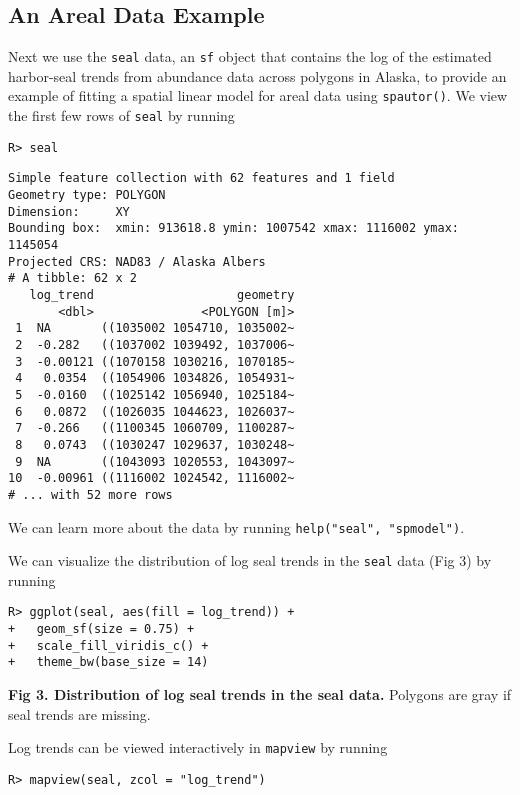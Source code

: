 \documentclass[10pt,letterpaper]{article}
\begin{document}
\hypertarget{an-areal-data-example}{%
\subsection{An Areal Data Example}\label{an-areal-data-example}}

Next we use the \texttt{seal} data, an \texttt{sf} object that contains
the log of the estimated harbor-seal trends from abundance data across
polygons in Alaska, to provide an example of fitting a spatial linear
model for areal data using \texttt{spautor()}. We view the first few
rows of \texttt{seal} by running

\begin{verbatim}
R> seal
\end{verbatim}

\begin{verbatim}
Simple feature collection with 62 features and 1 field
Geometry type: POLYGON
Dimension:     XY
Bounding box:  xmin: 913618.8 ymin: 1007542 xmax: 1116002 ymax: 1145054
Projected CRS: NAD83 / Alaska Albers
# A tibble: 62 x 2
   log_trend                    geometry
       <dbl>               <POLYGON [m]>
 1  NA       ((1035002 1054710, 1035002~
 2  -0.282   ((1037002 1039492, 1037006~
 3  -0.00121 ((1070158 1030216, 1070185~
 4   0.0354  ((1054906 1034826, 1054931~
 5  -0.0160  ((1025142 1056940, 1025184~
 6   0.0872  ((1026035 1044623, 1026037~
 7  -0.266   ((1100345 1060709, 1100287~
 8   0.0743  ((1030247 1029637, 1030248~
 9  NA       ((1043093 1020553, 1043097~
10  -0.00961 ((1116002 1024542, 1116002~
# ... with 52 more rows
\end{verbatim}

We can learn more about the data by running
\texttt{help("seal",\ "spmodel")}.

We can visualize the distribution of log seal trends in the
\texttt{seal} data (Fig 3) by running

\begin{verbatim}
R> ggplot(seal, aes(fill = log_trend)) +
+   geom_sf(size = 0.75) +
+   scale_fill_viridis_c() +
+   theme_bw(base_size = 14)
\end{verbatim}

\textbf{Fig 3. Distribution of log seal trends in the seal data.}
Polygons are gray if seal trends are missing.

Log trends can be viewed interactively in \texttt{mapview} by running

\begin{verbatim}
R> mapview(seal, zcol = "log_trend")
\end{verbatim}
\end{document}
